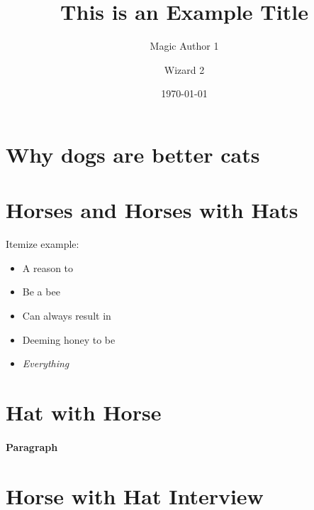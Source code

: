 \documentclass[a3paper, portrait, english, default]{uulm-cs-poster}
\title{This is an Example Title}
\author{Magic Author 1\and Wizard 2}
\institute{The Amazing Institute}
\date{\today}
\begin{document}
\maketitle
\section*{Why dogs are better cats}
\lipsum[2]
\vfil
\begin{multicols}{3}
\section*{Horses and Horses with Hats}
   \lipsum[1-3]
   Itemize example:
   \begin{itemize}
      \item A reason to
      \item Be a bee
      \item Can always result in
      \item Deeming honey to be
      \item \textit{Everything}
   \end{itemize}
\section*{Hat with Horse}
   \lipsum[4-6]
   \paragraph{Paragraph}\lipsum[7]
\end{multicols}
\lipsum[2]
\section*{Horse with Hat Interview}
\begin{multicols}{4}
   \lipsum[2]
   \printbibliography
\end{multicols}
\end{document}

